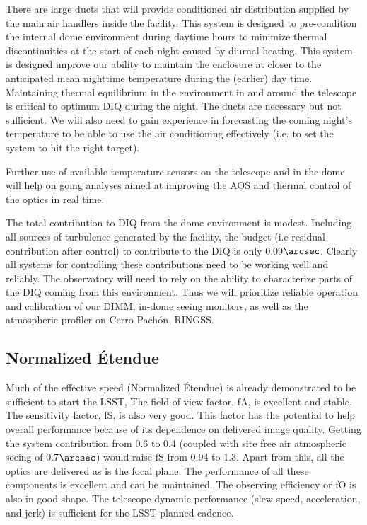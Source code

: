 There are large ducts that will provide conditioned air distribution supplied by the main air handlers inside the facility. This system is designed to pre-condition the internal dome environment during daytime hours to minimize thermal discontinuities at the start of each night caused by diurnal heating.  This system is designed improve our ability to maintain the enclosure at closer to the anticipated mean nighttime temperature during the (earlier) day time. Maintaining thermal equilibrium in the environment in and around the telescope is critical to optimum DIQ during the night. The ducts are necessary but not sufficient. We will also need to gain experience in forecasting the coming night's temperature to be able to use the air conditioning effectively (i.e. to set the system to hit the right target). 

Further use of available temperature sensors on the telescope and in the dome will help on going analyses aimed at improving the AOS and thermal control of the optics in real time. 

The total contribution to DIQ from the dome environment is modest. Including all sources of turbulence generated by the facility, the budget (i.e residual contribution after control) to contribute to the DIQ is only 0.09$\arcsec$. Clearly all systems for controlling these contributions need to be working well and reliably. The observatory will need to rely on the ability to characterize parts of the DIQ coming from this environment. Thus we will prioritize reliable operation and calibration of our DIMM, in-dome seeing monitors, as well as the atmospheric profiler on Cerro Pach\'{on}, RINGSS.  

\subsection{Normalized \'{E}tendue}
Much of the effective speed (Normalized  \'{E}tendue) is already demonstrated to be sufficient to start the LSST, The field of view factor, fA, is excellent and stable. The sensitivity factor, fS, is also very good. This factor has the potential to help overall performance because of its dependence on delivered image quality. Getting the system contribution from 0.6 to 0.4 (coupled with site free air atmospheric seeing of 0.7$\arcsec$) would raise fS from 0.94 to 1.3. Apart from this, all the optics are delivered as is the focal plane. The performance of all these components is excellent and can be maintained. The observing efficiency or fO is also in good shape. The telescope dynamic performance (slew speed, acceleration, and jerk) is sufficient for the LSST planned cadence. 

